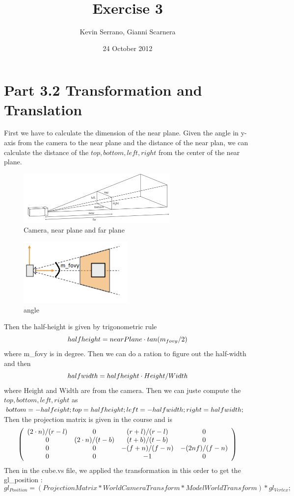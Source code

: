 \documentclass[10pt,a4paper]{report}
\author{Kevin Serrano, Gianni Scarnera}
\title{Exercise 3}
\date{24 October 2012}
\begin{document}
\maketitle

\section*{Part 3.2  Transformation and Translation}
First we have to calculate the dimension of the near plane. Given the angle in y-axis from the camera to the near plane and the distance of the near plan, we can calculate the distance of the $top,bottom,left,right$ from the center of the near plane.
\begin{figure}[h!]
\caption{Camera, near plane and far plane}
  \centering
    \includegraphics[width=0.7\textwidth]{plane.png}
\end{figure}
\begin{figure}[h!]
\caption{angle}
  \centering
    \includegraphics[width=0.5\textwidth]{angle.png}
\end{figure}
Then the half-height is given by trigonometric rule $$half\-height = nearPlane \cdot tan(m_{fovy}/2)$$ where m\_fovy is in degree. Then we can do a ration to figure out the half-width and then $$half\-width = half\-height \cdot Height/Width$$ where Height and Width are from the camera.
Then we can juste compute the $top,bottom,left,right$ as 	$bottom = -half\-eight;
        top = half\-height;
        left = -half\-width;
        right = half\-width;$\\
Then the projection matrix is given in the course and is \[ \left( \begin{array}{cccc}
$$(2 \cdot n)/(r-l)$$ & 0 & $$(r+l)/(r-l)$$ & 0\\
0 & $$(2 \cdot n)/(t-b)$$ & $$(t+b)/(t-b)$$ & 0\\
0 & 0 & $$-(f+n)/(f-n)$$ & $$-(2nf)/(f-n)$$\\
0 & 0 & -1 & 0\end{array} \right)\] 
Then in the cube.vs file, we applied the transformation in this order to get the gl\_position :
$$gl_{Position} = (ProjectionMatrix * WorldCameraTransform * ModelWorldTransform) * gl_{Vertex};$$
\newpage
\end{document}
